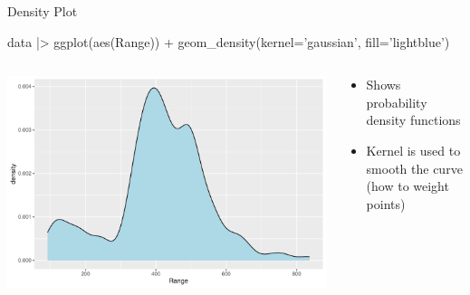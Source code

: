 \documentclass[ignorenonframetext,xcolor=x11names]{beamer}
\begin{document}
\begin{frame}[fragile]{Density Plot}

\begin{Rcode}
data |> 
  ggplot(aes(Range)) + 
    geom_density(kernel='gaussian', fill='lightblue')
\end{Rcode}
\begin{columns}
\begin{column}{.75\textwidth}
\includegraphics[width=\textwidth]{fuel.density.simple.pdf}
\end{column}
\begin{column}{.35\textwidth}
\footnotesize
\begin{itemize}
\item Shows probability density functions
\item Kernel is used to smooth the curve (how to weight points)
\end{itemize}
\end{column}
\end{columns}
\end{frame}
\end{document}

